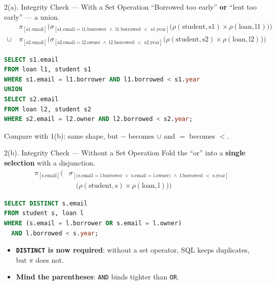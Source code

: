 \documentclass{beamer}
\newcommand\proj[1]{\pi_{[\text{#1}]}}
\newcommand\sel[1]{\sigma_{[\text{#1}]}}
\newcommand\ren[2]{\rho(\text{#1},\text{#2})}
\begin{document}
\begin{frame}[fragile]{2(a). Integrity Check --- With a Set Operation}
\footnotesize
``Borrowed too early'' \textbf{or} ``lent too early'' --- a union.
\[
\begin{aligned}
&\proj{s1.email}\Big(\sel{s1.email = l1.borrower $\wedge$ l1.borrowed $<$ s1.year}\big(\ren{student}{s1} \times \ren{loan}{l1}\big)\Big)\\
\cup\ &\proj{s2.email}\Big(\sel{s2.email = l2.owner $\wedge$ l2.borrowed $<$ s2.year}\big(\ren{student}{s2} \times \ren{loan}{l2}\big)\Big)
\end{aligned}
\]
\begin{lstlisting}[language=SQL]
SELECT s1.email
FROM loan l1, student s1
WHERE s1.email = l1.borrower AND l1.borrowed < s1.year
UNION
SELECT s2.email
FROM loan l2, student s2
WHERE s2.email = l2.owner AND l2.borrowed < s2.year;
\end{lstlisting}
Compare with 1(b): same shape, but $-$ becomes $\cup$ and $=$ becomes $<$.
\end{frame}

\begin{frame}[fragile]{2(b). Integrity Check --- Without a Set Operation}
\small
Fold the ``or'' into a \textbf{single selection} with a disjunction.
\[
\begin{aligned}
\proj{s.email}\Big(&\sel{(s.email = l.borrower $\vee$ s.email = l.owner) $\wedge$ l.borrowed $<$ s.year}\\
&\quad\big(\ren{student}{s} \times \ren{loan}{l}\big)\Big)
\end{aligned}
\]
\begin{lstlisting}[language=SQL]
SELECT DISTINCT s.email
FROM student s, loan l
WHERE (s.email = l.borrower OR s.email = l.owner)
  AND l.borrowed < s.year;
\end{lstlisting}
\begin{itemize}
  \item \textbf{\texttt{DISTINCT} is now required}: without a set operator, SQL keeps duplicates, but $\pi$ does not.
  \item \textbf{Mind the parentheses}: \texttt{AND} binds tighter than \texttt{OR}.
\end{itemize}
\end{frame}
\end{document}
